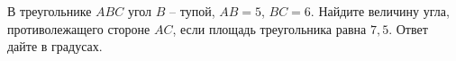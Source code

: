 \begin{ex}
	\begin{condition}
		В треугольнике \( ABC \) угол \( B \) – тупой, \(AB=5\), \(BC=6\). Найдите величину угла, противолежащего стороне \( AC \), если площадь треугольника равна \( 7,5 \). Ответ дайте в градусах.
	\end{condition}
\end{ex}